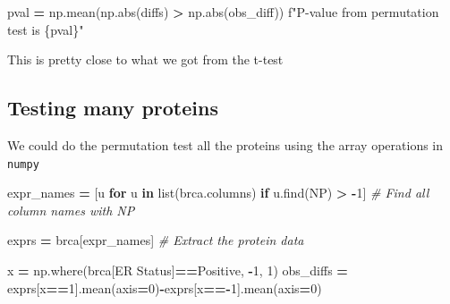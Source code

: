 \documentclass[
  letterpaper,
]{scrbook}
\newenvironment{Shaded}{\begin{snugshade}}{\end{snugshade}}
\newcommand{\BuiltInTok}[1]{#1}
\newcommand{\CommentTok}[1]{\textcolor[rgb]{0.56,0.35,0.01}{\textit{#1}}}
\newcommand{\ControlFlowTok}[1]{\textcolor[rgb]{0.13,0.29,0.53}{\textbf{#1}}}
\newcommand{\DecValTok}[1]{\textcolor[rgb]{0.00,0.00,0.81}{#1}}
\newcommand{\KeywordTok}[1]{\textcolor[rgb]{0.13,0.29,0.53}{\textbf{#1}}}
\newcommand{\NormalTok}[1]{#1}
\newcommand{\OperatorTok}[1]{\textcolor[rgb]{0.81,0.36,0.00}{\textbf{#1}}}
\newcommand{\SpecialCharTok}[1]{\textcolor[rgb]{0.00,0.00,0.00}{#1}}
\newcommand{\SpecialStringTok}[1]{\textcolor[rgb]{0.31,0.60,0.02}{#1}}
\newcommand{\StringTok}[1]{\textcolor[rgb]{0.31,0.60,0.02}{#1}}
\begin{document}
\begin{Shaded}
\begin{Highlighting}[]
\NormalTok{pval }\OperatorTok{=}\NormalTok{ np.mean(np.}\BuiltInTok{abs}\NormalTok{(diffs) }\OperatorTok{\textgreater{}}\NormalTok{ np.}\BuiltInTok{abs}\NormalTok{(obs\_diff))}
\SpecialStringTok{f"P{-}value from permutation test is }\SpecialCharTok{\{}\NormalTok{pval}\SpecialCharTok{\}}\SpecialStringTok{"}
\end{Highlighting}
\end{Shaded}

This is pretty close to what we got from the t-test

\hypertarget{testing-many-proteins}{%
\subsection{Testing many proteins}\label{testing-many-proteins}}

We could do the permutation test all the proteins using the array operations in \texttt{numpy}

\begin{Shaded}
\begin{Highlighting}[]
\NormalTok{expr\_names }\OperatorTok{=}\NormalTok{ [u }\ControlFlowTok{for}\NormalTok{ u }\KeywordTok{in} \BuiltInTok{list}\NormalTok{(brca.columns) }\ControlFlowTok{if}\NormalTok{ u.find(}\StringTok{\textquotesingle{}NP\textquotesingle{}}\NormalTok{) }\OperatorTok{\textgreater{}} \OperatorTok{{-}}\DecValTok{1}\NormalTok{] }\CommentTok{\# Find all column names with NP}

\NormalTok{exprs }\OperatorTok{=}\NormalTok{ brca[expr\_names] }\CommentTok{\# Extract the protein data}
\end{Highlighting}
\end{Shaded}

\begin{Shaded}
\begin{Highlighting}[]
\NormalTok{x }\OperatorTok{=}\NormalTok{ np.where(brca[}\StringTok{\textquotesingle{}ER Status\textquotesingle{}}\NormalTok{]}\OperatorTok{==}\StringTok{\textquotesingle{}Positive\textquotesingle{}}\NormalTok{, }\OperatorTok{{-}}\DecValTok{1}\NormalTok{, }\DecValTok{1}\NormalTok{)}
\NormalTok{obs\_diffs }\OperatorTok{=}\NormalTok{ exprs[x}\OperatorTok{==}\DecValTok{1}\NormalTok{].mean(axis}\OperatorTok{=}\DecValTok{0}\NormalTok{)}\OperatorTok{{-}}\NormalTok{exprs[x}\OperatorTok{=={-}}\DecValTok{1}\NormalTok{].mean(axis}\OperatorTok{=}\DecValTok{0}\NormalTok{)}
\end{Highlighting}
\end{Shaded}
\end{document}
